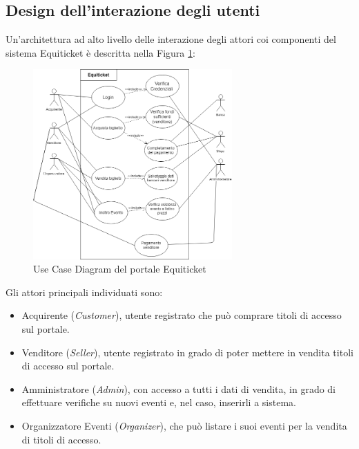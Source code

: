 \subsection{Design dell'interazione degli utenti}
Un'architettura ad alto livello delle interazione degli attori coi componenti del sistema Equiticket è descritta nella Figura \ref{usecase}:
\begin{figure}[H]
	\centering
	\includegraphics[width=0.68\textwidth]{chapter4/immagini/usecase}
	\caption{Use Case Diagram del portale Equiticket}
	\label{usecase}
\end{figure}
Gli attori principali individuati sono: 
\begin{itemize}
\item Acquirente (\textit{Customer}), utente registrato che può comprare titoli di accesso sul portale.
\item Venditore (\textit{Seller}), utente registrato in grado di poter mettere in vendita titoli di accesso sul portale.
\item Amministratore (\textit{Admin}), con accesso a tutti i dati di vendita, in grado di effettuare verifiche su nuovi eventi e, nel caso, inserirli a sistema.  
\item Organizzatore Eventi (\textit{Organizer}), che può listare i suoi eventi per la vendita di titoli di accesso.
\end{itemize}
